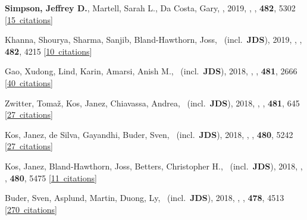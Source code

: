 \item[{\color{numcolor}\scriptsize25}] \textbf{Simpson, Jeffrey D.}, Martell, Sarah L., Da Costa, Gary, \etal, 2019, , \mnras, \textbf{482}, 5302 [\href{https://ui.adsabs.harvard.edu/#abs/2019MNRAS.482.5302S}{15~citations}]

\item[{\color{numcolor}\scriptsize24}] Khanna, Shourya, Sharma, Sanjib, Bland-Hawthorn, Joss, \etal\ (incl.\ \textbf{JDS}), 2019, , \mnras, \textbf{482}, 4215 [\href{https://ui.adsabs.harvard.edu/#abs/2019MNRAS.482.4215K}{10~citations}]

\item[{\color{numcolor}\scriptsize23}] Gao, Xudong, Lind, Karin, Amarsi, Anish M., \etal\ (incl.\ \textbf{JDS}), 2018, , \mnras, \textbf{481}, 2666 [\href{https://ui.adsabs.harvard.edu/#abs/2018MNRAS.481.2666G}{40~citations}]

\item[{\color{numcolor}\scriptsize22}] Zwitter, Toma{\v{z}}, Kos, Janez, Chiavassa, Andrea, \etal\ (incl.\ \textbf{JDS}), 2018, , \mnras, \textbf{481}, 645 [\href{https://ui.adsabs.harvard.edu/#abs/2018MNRAS.481..645Z}{27~citations}]

\item[{\color{numcolor}\scriptsize21}] Kos, Janez, de Silva, Gayandhi, Buder, Sven, \etal\ (incl.\ \textbf{JDS}), 2018, , \mnras, \textbf{480}, 5242 [\href{https://ui.adsabs.harvard.edu/#abs/2018MNRAS.480.5242K}{27~citations}]

\item[{\color{numcolor}\scriptsize20}] Kos, Janez, Bland-Hawthorn, Joss, Betters, Christopher H., \etal\ (incl.\ \textbf{JDS}), 2018, , \mnras, \textbf{480}, 5475 [\href{https://ui.adsabs.harvard.edu/#abs/2018MNRAS.480.5475K}{11~citations}]

\item[{\color{numcolor}\scriptsize19}] Buder, Sven, Asplund, Martin, Duong, Ly, \etal\ (incl.\ \textbf{JDS}), 2018, , \mnras, \textbf{478}, 4513 [\href{https://ui.adsabs.harvard.edu/#abs/2018MNRAS.478.4513B}{270~citations}]

